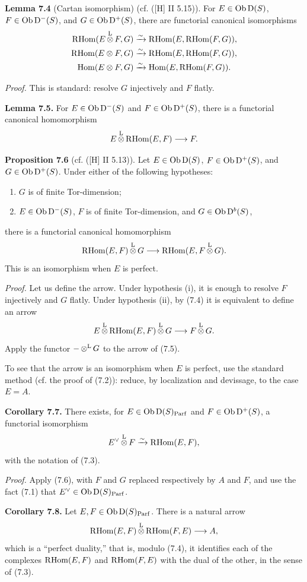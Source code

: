 \documentclass[11pt]{article}
\newcommand{\Parf}{\operatorname{Parf}}
\begin{document}
\textbf{Lemma 7.4} (Cartan isomorphism) (cf. ([H] II 5.15)). For \(E\in\operatorname{Ob}\mathrm D(S)\), \(F\in\operatorname{Ob}\mathrm D^-(S)\), and \(G\in\operatorname{Ob}\mathrm D^+(S)\), there are functorial canonical isomorphisms
\[
\begin{aligned}
\mathrm R\!\operatorname{Hom}(E\mathop{\otimes}^{\mathrm L} F,G)&\xrightarrow{\sim}\mathrm R\!\operatorname{Hom}(E,\mathrm R\!\operatorname{Hom}(F,G)),\\
\mathrm R\!\operatorname{Hom}(E\otimes F,G)&\xrightarrow{\sim}\mathrm R\!\operatorname{Hom}(E,\mathrm R\!\operatorname{Hom}(F,G)),\\
\operatorname{Hom}(E\otimes F,G)&\xrightarrow{\sim}\operatorname{Hom}(E,\mathrm R\!\operatorname{Hom}(F,G)).
\end{aligned}
\]

\emph{Proof.} This is standard: resolve \(G\) injectively and \(F\) flatly.

\textbf{Lemma 7.5.} For \(E\in\operatorname{Ob}\mathrm D^-(S)\) and \(F\in\operatorname{Ob}\mathrm D^+(S)\), there is a functorial canonical homomorphism
\[
  E\mathop{\otimes}^{\mathrm L} \mathrm R\!\operatorname{Hom}(E,F)\longrightarrow F.
\]

\textbf{Proposition 7.6} (cf. ([H] II 5.13)). Let \(E\in\operatorname{Ob}\mathrm D(S)\), \(F\in\operatorname{Ob}\mathrm D^+(S)\), and \(G\in\operatorname{Ob}\mathrm D^+(S)\). Under either of the following hypotheses:
\begin{enumerate}[label=(\roman*)]
\item \(G\) is of finite Tor-dimension;
\item \(E\in\operatorname{Ob}\mathrm D^-(S)\), \(F\) is of finite Tor-dimension, and \(G\in\operatorname{Ob}\mathrm D^b(S)\),
\end{enumerate}
there is a functorial canonical homomorphism
\[
  \mathrm R\!\operatorname{Hom}(E,F)\mathop{\otimes}^{\mathrm L} G
  \longrightarrow
  \mathrm R\!\operatorname{Hom}(E,F\mathop{\otimes}^{\mathrm L} G).
\]
This is an isomorphism when \(E\) is perfect.

\emph{Proof.} Let us define the arrow. Under hypothesis (i), it is enough to resolve \(F\) injectively and \(G\) flatly. Under hypothesis (ii), by (7.4) it is equivalent to define an arrow
\[
  E\mathop{\otimes}^{\mathrm L}\mathrm R\!\operatorname{Hom}(E,F)\mathop{\otimes}^{\mathrm L} G\longrightarrow F\mathop{\otimes}^{\mathrm L} G.
\]
Apply the functor \(-\mathop{\otimes}^{\mathrm L} G\) to the arrow of (7.5).

To see that the arrow is an isomorphism when \(E\) is perfect, use the standard method (cf. the proof of (7.2)): reduce, by localization and devissage, to the case \(E=A\).

\textbf{Corollary 7.7.} There exists, for \(E\in\Ob\Dpx(S)_{\Parf}\) and \(F\in\operatorname{Ob}\mathrm D^+(S)\), a functorial isomorphism
\[
  E^\vee\mathop{\otimes}^{\mathrm L} F\xrightarrow{\sim}\mathrm R\!\operatorname{Hom}(E,F),
\]
with the notation of (7.3).

\emph{Proof.} Apply (7.6), with \(F\) and \(G\) replaced respectively by \(A\) and \(F\), and use the fact (7.1) that \(E^\vee\in\Ob\Dpx(S)_{\Parf}\).

\textbf{Corollary 7.8.} Let \(E,F\in\Ob\Dpx(S)_{\Parf}\). There is a natural arrow
\[
  \mathrm R\!\operatorname{Hom}(E,F)\mathop{\otimes}^{\mathrm L} \mathrm R\!\operatorname{Hom}(F,E)\longrightarrow A,
\]
which is a ``perfect duality,'' that is, modulo (7.4), it identifies each of the complexes \(\mathrm R\!\operatorname{Hom}(E,F)\) and \(\mathrm R\!\operatorname{Hom}(F,E)\) with the dual of the other, in the sense of (7.3).
\end{document}

